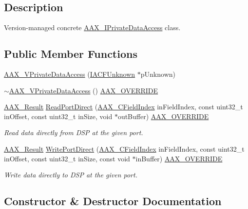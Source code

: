 \subsection{Description}
Version-\/managed concrete \mbox{\hyperlink{a01865}{A\+A\+X\+\_\+\+I\+Private\+Data\+Access}} class. \subsection*{Public Member Functions}
\begin{DoxyCompactItemize}
\item 
\mbox{\hyperlink{a01933_a5a7e43df303b7828d244026016ff1af9}{A\+A\+X\+\_\+\+V\+Private\+Data\+Access}} (\mbox{\hyperlink{a01409}{I\+A\+C\+F\+Unknown}} $\ast$p\+Unknown)
\item 
\mbox{\hyperlink{a01933_aac49bbafb2d49448384163adc2643192}{$\sim$\+A\+A\+X\+\_\+\+V\+Private\+Data\+Access}} () \mbox{\hyperlink{a00392_ac2f24a5172689ae684344abdcce55463}{A\+A\+X\+\_\+\+O\+V\+E\+R\+R\+I\+DE}}
\item 
\mbox{\hyperlink{a00392_a4d8f69a697df7f70c3a8e9b8ee130d2f}{A\+A\+X\+\_\+\+Result}} \mbox{\hyperlink{a01933_a7feff5ff4cfb64e5b87b4c94d2f8f6f6}{Read\+Port\+Direct}} (\mbox{\hyperlink{a00392_ae807f8986143820cfb5d6da32165c9c7}{A\+A\+X\+\_\+\+C\+Field\+Index}} in\+Field\+Index, const uint32\+\_\+t in\+Offset, const uint32\+\_\+t in\+Size, void $\ast$out\+Buffer) \mbox{\hyperlink{a00392_ac2f24a5172689ae684344abdcce55463}{A\+A\+X\+\_\+\+O\+V\+E\+R\+R\+I\+DE}}
\begin{DoxyCompactList}\small\item\em Read data directly from D\+SP at the given port. \end{DoxyCompactList}\item 
\mbox{\hyperlink{a00392_a4d8f69a697df7f70c3a8e9b8ee130d2f}{A\+A\+X\+\_\+\+Result}} \mbox{\hyperlink{a01933_ada15efac95e67272352441b3f6779323}{Write\+Port\+Direct}} (\mbox{\hyperlink{a00392_ae807f8986143820cfb5d6da32165c9c7}{A\+A\+X\+\_\+\+C\+Field\+Index}} in\+Field\+Index, const uint32\+\_\+t in\+Offset, const uint32\+\_\+t in\+Size, const void $\ast$in\+Buffer) \mbox{\hyperlink{a00392_ac2f24a5172689ae684344abdcce55463}{A\+A\+X\+\_\+\+O\+V\+E\+R\+R\+I\+DE}}
\begin{DoxyCompactList}\small\item\em Write data directly to D\+SP at the given port. \end{DoxyCompactList}\end{DoxyCompactItemize}


\subsection{Constructor \& Destructor Documentation}
\mbox{\label{a01933_a5a7e43df303b7828d244026016ff1af9}} 
